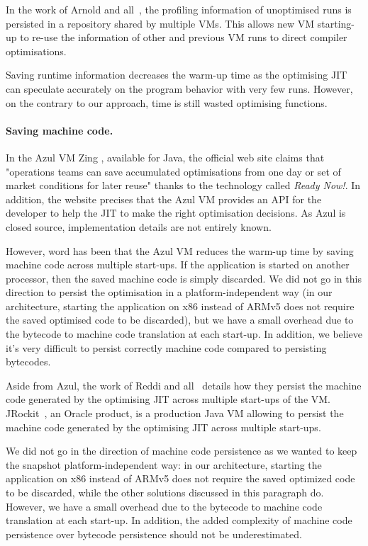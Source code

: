 \documentclass[a4paper,12pt,twoside]{../includes/ThesisStyle}
\begin{document}
In the work of Arnold and all~\cite{Arno05c}, the profiling information of unoptimised runs is persisted in a repository shared by multiple VMs. This allows new VM starting-up to re-use the information of other and previous VM runs to direct compiler optimisations.

Saving runtime information decreases the warm-up time as the optimising JIT can speculate accurately on the program behavior with very few runs. However, on the contrary to our approach, time is still wasted optimising functions.

\paragraph{Saving machine code.}

In the Azul VM Zing \cite{Azul}, available for Java, the official web site claims that "operations teams can save accumulated optimisations from one day or set of market conditions for later reuse" thanks to the technology called \emph{Ready Now!}. In addition, the website precises that the Azul VM provides an API for the developer to help the JIT to make the right optimisation decisions. As Azul is closed source, implementation details are not entirely known. 

However, word has been that the Azul VM reduces the warm-up time by saving machine code across multiple start-ups. If the application is started on another processor, then the saved machine code is simply discarded. We did not go in this direction to persist the optimisation in a platform-independent way (in our architecture, starting the application on x86 instead of ARMv5 does not require the saved optimised code to be discarded), but we have a small overhead due to the bytecode to machine code translation at each start-up. In addition, we believe it's very difficult to persist correctly machine code compared to persisting bytecodes.

Aside from Azul, the work of Reddi and all~\cite{Redd07a} details how they persist the machine code generated by the optimising JIT across multiple start-ups of the VM. JRockit~\cite{JRockit}, an Oracle product, is a production Java VM allowing to persist the machine code generated by the optimising JIT across multiple start-ups.

We did not go in the direction of machine code persistence as we wanted to keep the snapshot platform-independent way: in our architecture, starting the application on x86 instead of ARMv5 does not require the saved optimized code to be discarded, while the other solutions discussed in this paragraph do. However, we have a small overhead due to the bytecode to machine code translation at each start-up. In addition, the added complexity of machine code persistence over bytecode persistence should not be underestimated.
\end{document}
